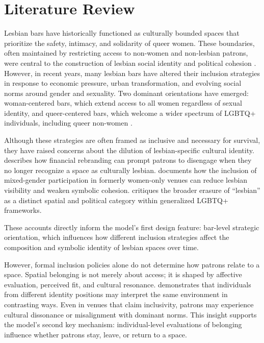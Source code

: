 \documentclass{article}
\begin{document}
\section{Literature Review}

\indent

Lesbian bars have historically functioned as culturally bounded spaces that prioritize the safety, intimacy, and solidarity of queer women. These boundaries, often maintained by restricting access to non-women and non-lesbian patrons, were central to the construction of lesbian social identity and political cohesion \citep{podmore2006}. However, in recent years, many lesbian bars have altered their inclusion strategies in response to economic pressure, urban transformation, and evolving social norms around gender and sexuality. Two dominant orientations have emerged: woman-centered bars, which extend access to all women regardless of sexual identity, and queer-centered bars, which welcome a wider spectrum of LGBTQ+ individuals, including queer non-women \citep{mattson2023, browne2021}.



Although these strategies are often framed as inclusive and necessary for survival, they have raised concerns about the dilution of lesbian-specific cultural identity. \citet{mattson2023} describes how financial rebranding can prompt patrons to disengage when they no longer recognize a space as culturally lesbian. \citet{podmore2006} documents how the inclusion of mixed-gender participation in formerly women-only venues can reduce lesbian visibility and weaken symbolic cohesion. \citet{browne2021} critiques the broader erasure of ``lesbian'' as a distinct spatial and political category within generalized LGBTQ+ frameworks.


These accounts directly inform the model’s first design feature: bar-level strategic orientation, which influences how different inclusion strategies affect the composition and symbolic identity of lesbian spaces over time.

However, formal inclusion policies alone do not determine how patrons relate to a space. Spatial belonging is not merely about access; it is shaped by affective evaluation, perceived fit, and cultural resonance. \citet{held2009} demonstrates that individuals from different identity positions may interpret the same environment in contrasting ways. Even in venues that claim inclusivity, patrons may experience cultural dissonance or misalignment with dominant norms. This insight supports the model’s second key mechanism: individual-level evaluations of belonging influence whether patrons stay, leave, or return to a space.
\end{document}
